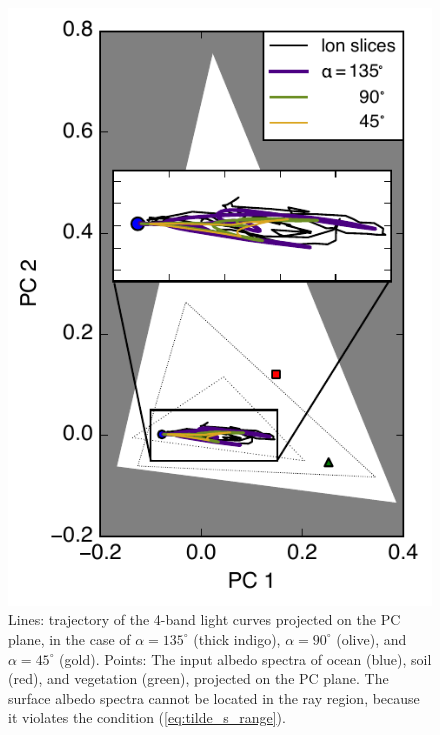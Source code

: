 \documentclass[iop,numberedappendix,apj,]{emulateapj}
\begin{document}
\begin{figure}[t]
    \begin{center}
\includegraphics[width=\hsize]{mockdata_3types_t360_lc_PCplane.pdf}
    \end{center}
    \caption{Lines: trajectory of the 4-band light curves projected on the PC plane, in the case of $\alpha = 135^{\circ }$ (thick indigo), $\alpha = 90^{\circ }$ (olive), and $\alpha = 45^{\circ }$ (gold). Points: The input albedo spectra of ocean (blue), soil (red), and vegetation (green), projected on the PC plane. The surface albedo spectra cannot be located in the ray region, because it violates the condition (\ref{eq:tilde_s_range}). }
    \label{fig:trajectory}
\end{figure}

\end{document}
